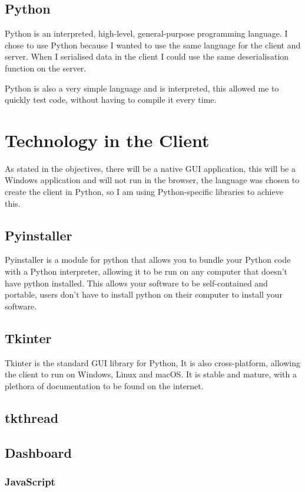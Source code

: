 \subsection{Python}
Python is an interpreted, high-level, general-purpose programming language.
I chose to use Python because I wanted to use the same language for the client and server.
When I serialised data in the client I could use the same deserialisation function on the server.

Python is also a very simple language and is interpreted, this allowed me to quickly test code, without having to compile it every time.

\section{Technology in the Client}
As stated in the objectives, there will be a native GUI application,
this will be a Windows application and will not run in the browser,
the language was chosen to create the client in Python,
so I am using Python-specific libraries to achieve this.

\subsection{Pyinstaller}
Pyinstaller is a module for python that allows you to bundle your Python code with a Python interpreter, allowing it to be run on any computer that doesn't have python installed.
This allows your software to be self-contained and portable, users don't have to install python on their computer to install your software.

\subsection{Tkinter}
Tkinter is the standard GUI library for Python,
It is also cross-platform, allowing the client to run on Windows, Linux and macOS.
It is stable and mature, with a plethora of documentation to be found on the internet.

\subsection{tkthread}

\subsection{Dashboard}
\subsubsection{JavaScript}

